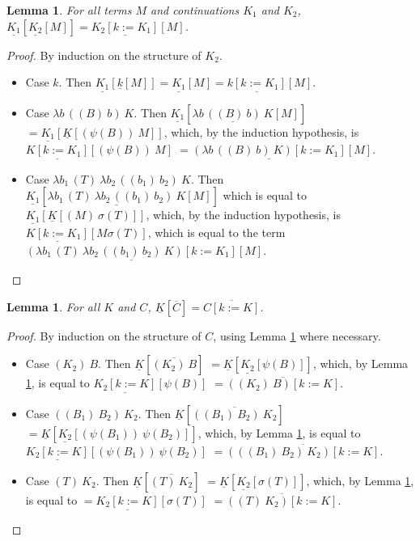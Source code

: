 \documentclass{LMCS}
\newtheorem{lemma}[theorem]{Lemma}
\begin{document}
\begin{lemma}\label{lem:continuation-composition}
  For all terms $M$ and continuations
  $K_{1}$ and $K_{2}$, 
  $
  \underline{K_{1}}[\underline{K_{2}}[M]]\!=\!\underline{K_{2}[k:=K_{1}]}[M]
  $.
\end{lemma}
\begin{proof}
  By induction on the structure of $K_{2}$. 
  \begin{itemize}
    \item Case $k$. Then $\underline{K_{1}}[\underline{k}[M]]=\underline{K_{1}}[M]=\underline{k[k:=K_{1}]}[M]$.
    \item Case $\lambda b\,((B)~b)~K$. Then 
      $\underline{K_{1}}[\underline{\lambda b\,((B)~b)~K}[M]]$
      $=\underline{K_{1}}[\underline{K}[(\psi(B))~M]]$,
      which, by the induction hypothesis, is 
      $\underline{K[k:=K_{1}]}[(\psi(B))~M]$
      $=\underline{(\lambda b\,((B)~b)~K)[k:=K_{1}]}[M]$.

    \item Case $\lambda b_1\,(T)~\lambda b_2\,((b_{1})~b_{2})~K$. Then 
      $\underline{K_{1}}[\underline{\lambda b_1\,(T)~\lambda b_2\,((b_{1})~b_{2})~K}[M]]$
      which is equal to
      $\underline{K_{1}}[\underline{K}[(M)~\sigma(T)]]$,
      which, by the induction hypothesis, is 
      $\underline{K[k:=K_{1}]}[M\sigma(T)]$, which is equal to the term
      $\underline{(\lambda b_1\,(T)~\lambda b_2\,((b_{1})~b_{2})~K)[k:=K_{1}]}[M]$.
      \qedhere
  \end{itemize}
\end{proof}

\begin{lemma}\label{lem:continuation-substitution}
  For all $K$ and $C$,
  $\underline{K}[\overline{C}]=\overline{C[k:=K]}$.
\end{lemma}
\begin{proof}
  By induction on the structure of $C$, using Lemma \ref{lem:continuation-composition}
  where necessary.
  \begin{itemize}
    \item Case $(K_{2})~B$. Then 
      $\underline{K}[\overline{(K_{2})~B}]$
      $=\underline{K}[\underline{K_{2}}[\psi(B)]]$,
      which, by Lemma \ref{lem:continuation-composition}, is equal to
      $\underline{K_{2}[k:=K]}[\psi(B)]$
      $=\overline{((K_{2})~B)[k:=K]}$.

    \item Case $((B_{1})~B_{2})~K_{2}$. Then 
      $\underline{K}[\overline{((B_{1})~B_{2})~K_{2}}]$
      $=\underline{K}[\underline{K_{2}}[(\psi(B_{1}))~\psi(B_{2})]]$,
      which, by Lemma \ref{lem:continuation-composition}, is equal to
      $\underline{K_{2}[k:=K]}[(\psi(B_{1}))~\psi(B_{2})]$
      $=\overline{(((B_{1})~B_{2})~K_{2})[k:=K]}$.

    \item Case $(T)~K_{2}$. Then 
      $\underline{K}[\overline{(T)~K_{2}}]$
      $=\underline{K}[\underline{K_{2}}[\sigma(T)]]$,
      which, by Lemma \ref{lem:continuation-composition}, is equal to
      $=\underline{K_{2}[k:=K]}[\sigma(T)]$
      $=\overline{((T)~K_{2})[k:=K]}$.
      \qedhere
  \end{itemize}
\end{proof}
\end{document}
